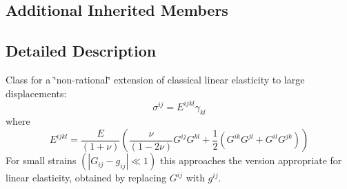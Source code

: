 \subsection*{Additional Inherited Members}


\subsection{Detailed Description}
Class for a \char`\"{}non-\/rational\char`\"{} extension of classical linear elasticity to large displacements\+: \[ \sigma^{ij} = E^{ijkl} \gamma_{kl} \] where \[ E^{ijkl} = \frac{E}{(1+\nu)} \left( \frac{\nu}{(1-2\nu)} G^{ij} G^{kl} + \frac{1}{2} \left( G^{ik} G^{jl} + G^{il} G^{jk} \right) \right) \] For small strains $ (| G_{ij} - g_{ij} | \ll 1)$ this approaches the version appropriate for linear elasticity, obtained by replacing $ G^{ij}$ with $ g^{ij}$.


